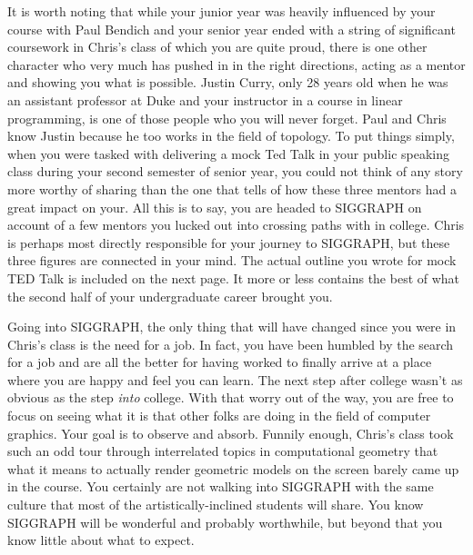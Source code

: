 \documentclass[a4paper, 11pt]{article} %
\begin{document}
It is worth noting that while your junior year was heavily influenced by your course with Paul Bendich and your senior year ended with a string of significant coursework in Chris's class of which you are quite proud, there is one other character who very much has pushed in in the right directions, acting as a mentor and showing you what is possible. Justin Curry, only 28 years old when he was an assistant professor at Duke and your instructor in a course in linear programming, is one of those people who you will never forget. Paul and Chris know Justin because he too works in the field of topology. To put things simply, when you were tasked with delivering a mock Ted Talk in your public speaking class during your second semester of senior year, you could not think of any story more worthy of sharing than the one that tells of how these three mentors had a great impact on your. All this is to say, you are headed to SIGGRAPH on account of a few mentors you lucked out into crossing paths with in college. Chris is perhaps most directly responsible for your journey to SIGGRAPH, but these three figures are connected in your mind. The actual outline you wrote for mock TED Talk is included on the next page. It more or less contains the best of what the second half of your undergraduate career brought you.

Going into SIGGRAPH, the only thing that will have changed since you were in Chris's class is the need for a job. In fact, you have been humbled by the search for a job and are all the better for having worked to finally arrive at a place where you are happy and feel you can learn. The next step after college wasn't as obvious as the step \textit{into} college. With that worry out of the way, you are free to focus on seeing what it is that other folks are doing in the field of computer graphics. Your goal is to observe and absorb. Funnily enough, Chris's class took such an odd tour through interrelated topics in computational geometry that what it means to actually render geometric models on the screen barely came up in the course. You certainly are not walking into SIGGRAPH with the same culture that most of the artistically-inclined students will share. You know SIGGRAPH will be wonderful and probably worthwhile, but beyond that you know little about what to expect.


\end{document}
